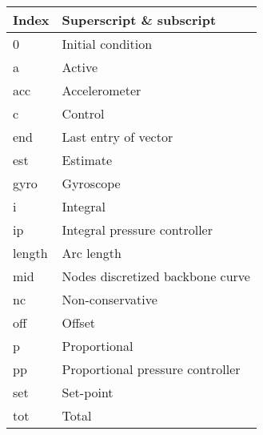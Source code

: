 \begin{spacing}{0.9}
\begin{multicols}{2}
\begin{table}[H]
\centering
    \begin{tabular}{p{1.1cm} p{5.4cm}} \hline
    \textbf{Index}    &   \textbf{Superscript \& subscript}\\ \hline
    0     &  Initial condition \\
    a     &  Active \\
    acc    & Accelerometer \\
    c     & Control \\
    end   & Last entry of vector \\
    est   & Estimate \\
    gyro  & Gyroscope \\
    i     & Integral \\
    ip     & Integral pressure controller \\
    length & Arc length \\
    mid    & Nodes discretized backbone curve \\
    nc    & Non-conservative \\
    off   & Offset \\
    p    & Proportional \\
    pp    & Proportional pressure controller\\
    set   & Set-point \\
    tot    & Total \\ \hline
    \end{tabular}
\end{table}







\end{multicols}
\end{spacing}

